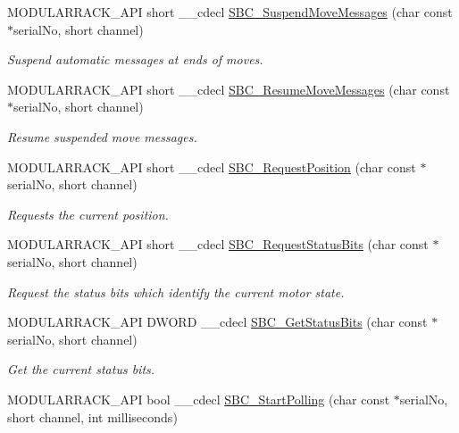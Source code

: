\begin{DoxyCompactItemize}
M\+O\+D\+U\+L\+A\+R\+R\+A\+C\+K\+\_\+\+A\+PI short \+\_\+\+\_\+cdecl \hyperlink{group___modular_stepper_ga364964be1a00d7057f4d024d32a2c9db}{S\+B\+C\+\_\+\+Suspend\+Move\+Messages} (char const $\ast$serial\+No, short channel)
\begin{DoxyCompactList}\small\item\em Suspend automatic messages at ends of moves. \end{DoxyCompactList}\item 
M\+O\+D\+U\+L\+A\+R\+R\+A\+C\+K\+\_\+\+A\+PI short \+\_\+\+\_\+cdecl \hyperlink{group___modular_stepper_gaecf1fd863780910a8568a27d6be68cd9}{S\+B\+C\+\_\+\+Resume\+Move\+Messages} (char const $\ast$serial\+No, short channel)
\begin{DoxyCompactList}\small\item\em Resume suspended move messages. \end{DoxyCompactList}\item 
M\+O\+D\+U\+L\+A\+R\+R\+A\+C\+K\+\_\+\+A\+PI short \+\_\+\+\_\+cdecl \hyperlink{group___modular_stepper_ga245db740f4628c998d62503dec0ca7a7}{S\+B\+C\+\_\+\+Request\+Position} (char const $\ast$serial\+No, short channel)
\begin{DoxyCompactList}\small\item\em Requests the current position. \end{DoxyCompactList}\item 
M\+O\+D\+U\+L\+A\+R\+R\+A\+C\+K\+\_\+\+A\+PI short \+\_\+\+\_\+cdecl \hyperlink{group___modular_stepper_ga41fe6d5c1f4167ac8ddab2a9930692a5}{S\+B\+C\+\_\+\+Request\+Status\+Bits} (char const $\ast$serial\+No, short channel)
\begin{DoxyCompactList}\small\item\em Request the status bits which identify the current motor state. \end{DoxyCompactList}\item 
M\+O\+D\+U\+L\+A\+R\+R\+A\+C\+K\+\_\+\+A\+PI D\+W\+O\+RD \+\_\+\+\_\+cdecl \hyperlink{group___modular_stepper_ga425b5f1e4607f2aaa67d6b4c65278a29}{S\+B\+C\+\_\+\+Get\+Status\+Bits} (char const $\ast$serial\+No, short channel)
\begin{DoxyCompactList}\small\item\em Get the current status bits. \end{DoxyCompactList}\item 
M\+O\+D\+U\+L\+A\+R\+R\+A\+C\+K\+\_\+\+A\+PI bool \+\_\+\+\_\+cdecl \hyperlink{group___modular_stepper_gaf9b4e04f96f4be7f53dd7b219222f653}{S\+B\+C\+\_\+\+Start\+Polling} (char const $\ast$serial\+No, short channel, int milliseconds)

\end{DoxyCompactItemize}
